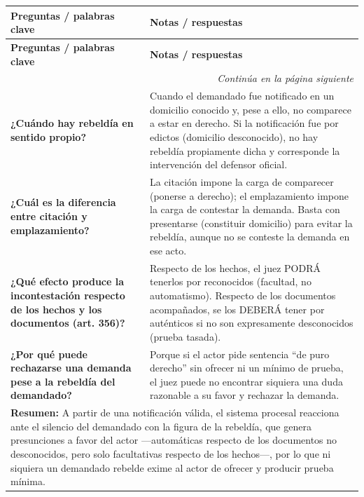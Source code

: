 \documentclass[12pt,oneside]{book}
\begin{document}
\begin{longtable}{
    p{}
    p{}
}
\toprule
\textbf{Preguntas / palabras clave} & \textbf{Notas / respuestas} \\
\midrule
\endfirsthead
\toprule
\textbf{Preguntas / palabras clave} & \textbf{Notas / respuestas} \\
\midrule
\endhead
\midrule
\multicolumn{2}{r}{\textit{Continúa en la página siguiente}} \\
\endfoot
\bottomrule
\endlastfoot

\textbf{¿Cuándo hay rebeldía en sentido propio?} &
Cuando el demandado fue notificado en un domicilio conocido y, pese a ello, no comparece a estar en derecho. Si la notificación fue por edictos (domicilio desconocido), no hay rebeldía propiamente dicha y corresponde la intervención del defensor oficial. \\

\textbf{¿Cuál es la diferencia entre citación y emplazamiento?} &
La citación impone la carga de comparecer (ponerse a derecho); el emplazamiento impone la carga de contestar la demanda. Basta con presentarse (constituir domicilio) para evitar la rebeldía, aunque no se conteste la demanda en ese acto. \\

\textbf{¿Qué efecto produce la incontestación respecto de los hechos y los documentos (art. 356)?} &
Respecto de los hechos, el juez PODRÁ tenerlos por reconocidos (facultad, no automatismo). Respecto de los documentos acompañados, se los DEBERÁ tener por auténticos si no son expresamente desconocidos (prueba tasada). \\

\textbf{¿Por qué puede rechazarse una demanda pese a la rebeldía del demandado?} &
Porque si el actor pide sentencia ``de puro derecho'' sin ofrecer ni un mínimo de prueba, el juez puede no encontrar siquiera una duda razonable a su favor y rechazar la demanda. \\

\midrule
\multicolumn{2}{p{\dimexpr\textwidth-2\tabcolsep\relax}}{
\textbf{Resumen:} A partir de una notificación válida, el sistema procesal reacciona ante el silencio del demandado con la figura de la rebeldía, que genera presunciones a favor del actor —automáticas respecto de los documentos no desconocidos, pero solo facultativas respecto de los hechos—, por lo que ni siquiera un demandado rebelde exime al actor de ofrecer y producir prueba mínima.
} \\

\end{longtable}
\end{document}
